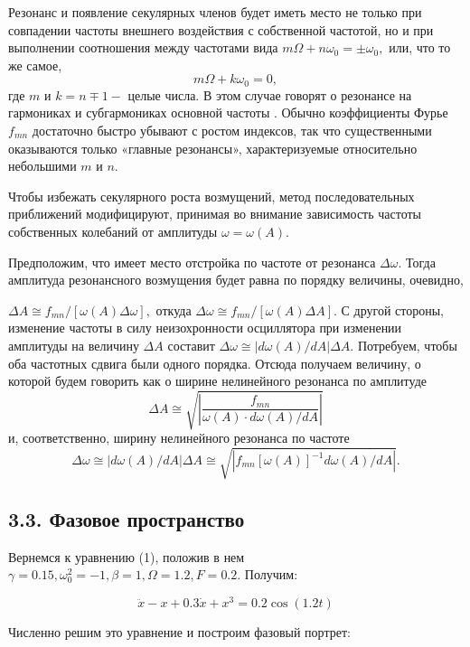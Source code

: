 \documentclass[11pt]{article}
\begin{document}
Резонанс и появление секулярных членов будет иметь место не только при
совпадении частоты внешнего воздействия с собственной частотой, но и при
выполнении соотношения между частотами вида
\(m \Omega+n \omega_{0}=\pm \omega_{0},\) или, что то же самое, \[
m \Omega+k \omega_{0}=0,
\] где \(m\) и \(k=n \mp 1-\) целые числа. В этом случае говорят о
резонансе на гармониках и субгармониках основной частоты \Omega. Обычно
коэффициенты Фурье \(f_{m n}\) достаточно быстро убывают с ростом
индексов, так что существенными оказываются только «главные резонансы»,
характеризуемые относительно небольшими \(m\) и \(n .\)

Чтобы избежать секулярного роста возмущений, метод последовательных
приближений модифицируют, принимая во внимание зависимость частоты
собственных колебаний от амплитуды \(\omega=\omega(A).\)

Предположим, что имеет место отстройка по частоте от резонанса
\(\Delta \omega .\) Тогда амплитуда резонансного возмущения будет равна
по порядку величины, очевидно,

\(\Delta A \cong f_{m n} /[\omega(A) \Delta \omega],\) откуда
\(\Delta \omega \cong f_{m n} /[\omega(A) \Delta A] .\) С другой
стороны, изменение частоты в силу неизохронности осциллятора при
изменении амплитуды на величину \(\Delta A\) составит
\(\Delta \omega \cong|d \omega(A) / d A| \Delta A .\) Потребуем, чтобы
оба частотных сдвига были одного порядка. Отсюда получаем величину, о
которой будем говорить как о ширине нелинейного резонанса по амплитуде
\[
\Delta A \cong \sqrt{\left| \frac{f_{m n}}{\omega(A) \cdot d \omega(A) / d A} \right|}
\] и, соответственно, ширину нелинейного резонанса по частоте \[
\Delta \omega \cong|d \omega(A) / d A| \Delta A \cong \sqrt{\left|f_{m n}[\omega(A)]^{-1} d \omega(A) / d A\right|}.
\]

    \hypertarget{ux444ux430ux437ux43eux432ux43eux435-ux43fux440ux43eux441ux442ux440ux430ux43dux441ux442ux432ux43e}{%
\subsection{3.3. Фазовое
пространство}\label{ux444ux430ux437ux43eux432ux43eux435-ux43fux440ux43eux441ux442ux440ux430ux43dux441ux442ux432ux43e}}

Вернемся к уравнению (1), положив в нем
\(\gamma =0.15, \omega_0^2 = -1, \beta = 1, \Omega = 1.2, F = 0.2\).
Получим:

\[\ddot{x} - x + 0.3 \dot{x} + x^3 =0.2 \cos(1.2 t)\]

Численно решим это уравнение и построим фазовый портрет:
\end{document}
